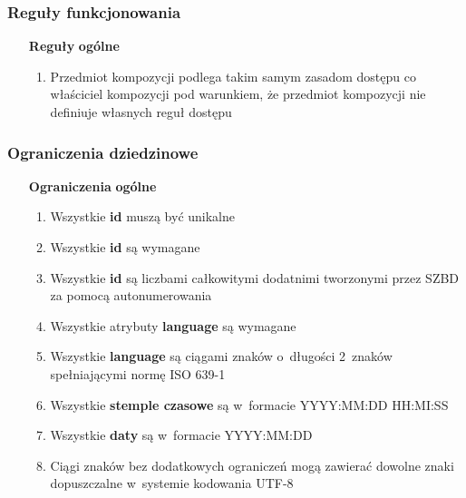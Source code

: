 \subsubsection{Reguły funkcjonowania}\label{subsubsec:database:domain:functionalRules}
\begin{itemize}[label={\textbf{Reguły dla}}, wide, labelwidth=!, labelindent=0pt]
    \setlength\itemsep{1.75em}
    \item[\textbf{Reguły}] \textbf{ogólne}
    \begin{enumerate}[label={\textbf{REG/0/\protect\twodigits{\arabic{enumi}}}}, wide, labelwidth=!, align=left, leftmargin=3cm]
        \item Przedmiot kompozycji podlega takim samym zasadom dostępu co właściciel kompozycji pod warunkiem, że przedmiot kompozycji nie definiuje własnych reguł dostępu
    \end{enumerate}
\end{itemize}

\subsubsection{Ograniczenia dziedzinowe}\label{subsubsec:database:domain:restrictions}

\begin{itemize}[label={\textbf{Ograniczenia dla}}, wide, labelwidth=!, labelindent=0pt]
    \setlength\itemsep{1.75em}
    \item[\textbf{Ograniczenia}] \textbf{ogólne}
    \begin{enumerate}[label={\textbf{OGR/0/\protect\twodigits{\arabic{enumi}}}}, wide, labelwidth=!, align=left, leftmargin=3cm]
        \item Wszystkie \textbf{id} muszą być unikalne
        \item Wszystkie \textbf{id} są wymagane
        \item Wszystkie \textbf{id} są liczbami całkowitymi dodatnimi tworzonymi przez SZBD za pomocą autonumerowania
        \item Wszystkie atrybuty \textbf{language} są wymagane
        \item Wszystkie \textbf{language} są ciągami znaków o~długości 2~znaków spełniającymi normę ISO 639-1
        \item Wszystkie \textbf{stemple czasowe} są w~formacie YYYY:MM:DD HH:MI:SS
        \item Wszystkie \textbf{daty} są w~formacie YYYY:MM:DD
        \item Ciągi znaków bez dodatkowych ograniczeń mogą zawierać dowolne znaki dopuszczalne w~systemie kodowania UTF-8
    \end{enumerate}
\end{itemize}

